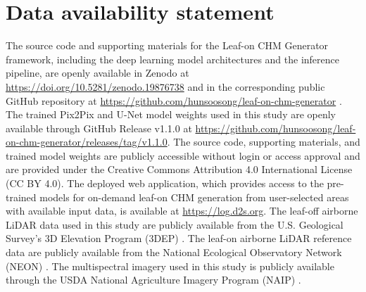 \section*{Data availability statement}
The source code and supporting materials for the Leaf-on CHM Generator framework, including the deep learning model architectures and the inference pipeline, are openly available in Zenodo at \url{https://doi.org/10.5281/zenodo.19876738} and in the corresponding public GitHub repository at \url{https://github.com/hunsoosong/leaf-on-chm-generator} \cite{kim2026leafonchmdata}.
The trained Pix2Pix and U-Net model weights used in this study are openly available through GitHub Release v1.1.0 at \url{https://github.com/hunsoosong/leaf-on-chm-generator/releases/tag/v1.1.0}.
The source code, supporting materials, and trained model weights are publicly accessible without login or access approval and are provided under the Creative Commons Attribution 4.0 International License (CC BY 4.0). 
The deployed web application, which provides access to the pre-trained models for on-demand leaf-on CHM generation from user-selected areas with available input data, is available at \url{https://log.d2s.org}. 
The leaf-off airborne LiDAR data used in this study are publicly available from the U.S. Geological Survey's 3D Elevation Program (3DEP) \cite{3DEP}. 
The leaf-on airborne LiDAR reference data are publicly available from the National Ecological Observatory Network (NEON) \cite{NEON}. 
The multispectral imagery used in this study is publicly available through the USDA National Agriculture Imagery Program (NAIP) \cite{NAIP}.



